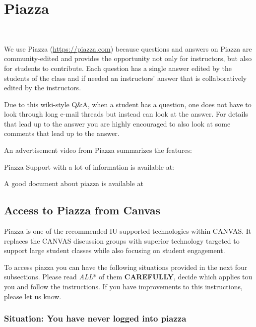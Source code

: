 
\chapter{Piazza}\label{C:piazza}

\FILENAME\

We use Piazza (\url{https://piazza.com}) because questions and answers
on Piazza are community-edited and provides the opportunity not only
for instructors, but also for students to contribute. Each question
has a single answer edited by the students of the class and if needed
an instructors' answer that is collaboratively edited by the
instructors.

Due to this wiki-style Q\&A, when a student has a question, one does not
have to look through long e-mail threads but instead can look at the
answer. For details that lead up to the answer you are highly encouraged
to also look at some comments that lead up to the answer.

An advertisement video from Piazza summarizes the features:


Piazza Support with a lot of information is available at:


A good document about piazza is available at


\section{Access to Piazza from Canvas}

Piazza is one of the recommended IU supported technologies within
CANVAS. It replaces the CANVAS discussion groups with superior
technology targeted to support large student classes while also
focusing on student engagement.

To access piazza you can have the following situations provided in the
next four subsections. Please read \emph{ALL}* of them
\textbf{CAREFULLY}, decide which applies tou you and follow the
instructions. If you have improvements to this instructions, please let
us know.

\subsection*{Situation: You have never logged into piazza}

